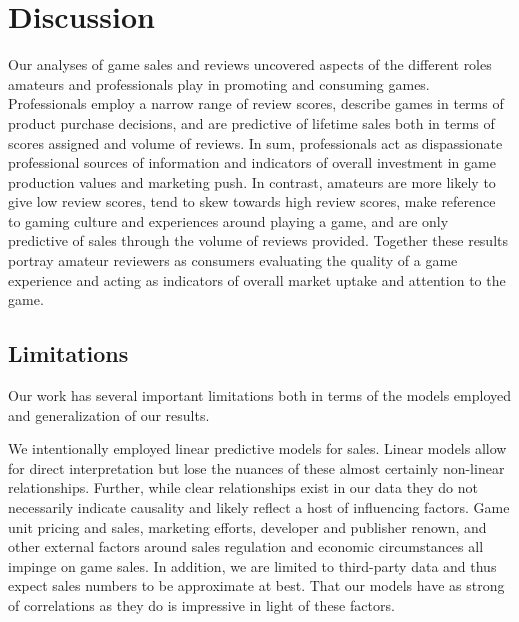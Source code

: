 \documentclass[letterpaper]{article}
\begin{document}
\section{Discussion}
Our analyses of game sales and reviews uncovered aspects of the different roles amateurs and professionals play in promoting and consuming games. Professionals employ a narrow range of review scores, describe games in terms of product purchase decisions, and are predictive of lifetime sales both in terms of scores assigned and volume of reviews. In sum, professionals act as dispassionate professional sources of information and indicators of overall investment in game production values and marketing push. In contrast, amateurs are more likely to give low review scores, tend to skew towards high review scores, make reference to gaming culture and experiences around playing a game, and are only predictive of sales through the volume of reviews provided. Together these results portray amateur reviewers as consumers evaluating the quality of a game experience and acting as indicators of overall market uptake and attention to the game.


\subsection{Limitations}
Our work has several important limitations both in terms of the models employed and generalization of our results.

We intentionally employed linear predictive models for sales. Linear models allow for direct interpretation but lose the nuances of these almost certainly non-linear relationships. Further, while clear relationships exist in our data they do not necessarily indicate causality and likely reflect a host of influencing factors. Game unit pricing and sales, marketing efforts, developer and publisher renown, and other external factors around sales regulation and economic circumstances all impinge on game sales. In addition, we are limited to third-party data and thus expect sales numbers to be approximate at best. That our models have as strong of correlations as they do is impressive in light of these factors.
\end{document}
